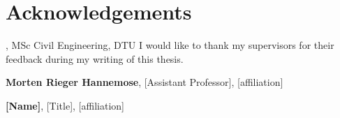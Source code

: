 \section*{Acknowledgements}
\textbf{\thesisauthor}, MSc Civil Engineering, DTU \newline
I would like to thank my supervisors for their feedback during my writing of this thesis.

\textbf{Morten Rieger Hannemose}, [Assistant Professor], [affiliation] \newline
[text]

\textbf{[Name]}, [Title], [affiliation] \newline
[text]

